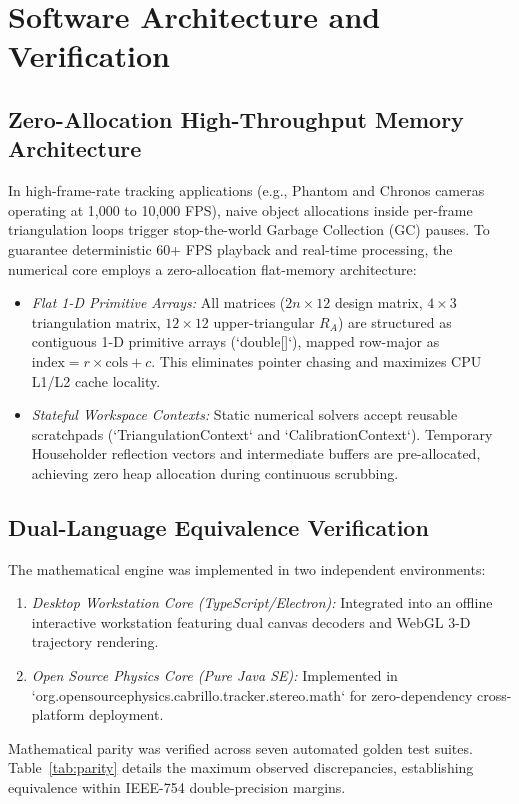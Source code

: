 \documentclass[a4paper,conference]{IEEEtran}
\begin{document}
\section{Software Architecture and Verification}

\subsection{Zero-Allocation High-Throughput Memory Architecture}
In high-frame-rate tracking applications (e.g., Phantom and Chronos cameras operating at 1,000 to 10,000 FPS), naive object allocations inside per-frame triangulation loops trigger stop-the-world Garbage Collection (GC) pauses. To guarantee deterministic 60+ FPS playback and real-time processing, the numerical core employs a zero-allocation flat-memory architecture:
\begin{itemize}
  \item \textit{Flat 1-D Primitive Arrays:} All matrices ($2n \times 12$ design matrix, $4 \times 3$ triangulation matrix, $12 \times 12$ upper-triangular $R_A$) are structured as contiguous 1-D primitive arrays (`double[]`), mapped row-major as $\mathrm{index} = r \times \mathrm{cols} + c$. This eliminates pointer chasing and maximizes CPU L1/L2 cache locality.
  \item \textit{Stateful Workspace Contexts:} Static numerical solvers accept reusable scratchpads (`TriangulationContext` and `CalibrationContext`). Temporary Householder reflection vectors and intermediate buffers are pre-allocated, achieving zero heap allocation during continuous scrubbing.
\end{itemize}

\subsection{Dual-Language Equivalence Verification}
The mathematical engine was implemented in two independent environments:
\begin{enumerate}
  \item \textit{Desktop Workstation Core (TypeScript/Electron):} Integrated into an offline interactive workstation featuring dual canvas decoders and WebGL 3-D trajectory rendering.
  \item \textit{Open Source Physics Core (Pure Java SE):} Implemented in `org.opensourcephysics.cabrillo.tracker.stereo.math` for zero-dependency cross-platform deployment.
\end{enumerate}
Mathematical parity was verified across seven automated golden test suites. Table~\ref{tab:parity} details the maximum observed discrepancies, establishing equivalence within IEEE-754 double-precision margins.
\end{document}
